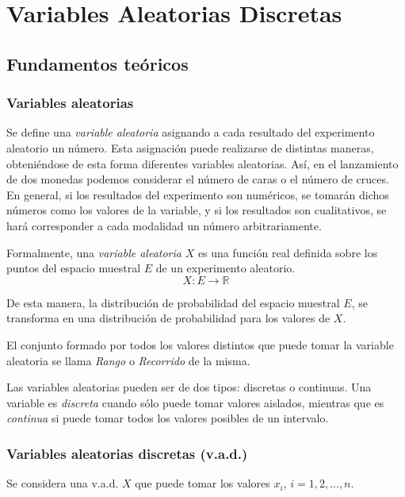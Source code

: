 
\chapter{Variables Aleatorias Discretas}

\section{Fundamentos teóricos}
\subsection{Variables aleatorias}
Se define una \emph{variable aleatoria} asignando a cada resultado del experimento aleatorio un número. Esta asignación
puede realizarse de distintas maneras, obteniéndose de esta forma diferentes variables aleatorias. Así, en el lanzamiento
de dos monedas podemos considerar el número de caras o el número de cruces. En general, si los resultados del experimento
son numéricos, se tomarán dichos números como los valores de la variable, y si los resultados son cualitativos, se hará
corresponder a cada modalidad un número arbitrariamente.

Formalmente, una \emph{variable aleatoria} $X$ es una función real definida sobre los puntos del espacio muestral $E$ de
un experimento aleatorio. \[ X:E\rightarrow \mathbb{R}\]

De esta manera, la distribución de probabilidad del espacio muestral $E$, se transforma en una distribución de
probabilidad para los valores de $X$.

El conjunto formado por todos los valores distintos que puede tomar la variable aleatoria se llama \emph{Rango} o
\emph{Recorrido} de la misma.

Las variables aleatorias pueden ser de dos tipos: discretas o continuas. Una variable es \emph{discreta} cuando sólo
puede tomar valores aislados, mientras que es \emph{continua} si puede tomar todos los valores posibles de un intervalo.

\subsection{Variables aleatorias discretas (v.a.d.)}
Se considera una v.a.d. $X$ que puede tomar los valores $x_i$, $i=1,2,...,n$.

